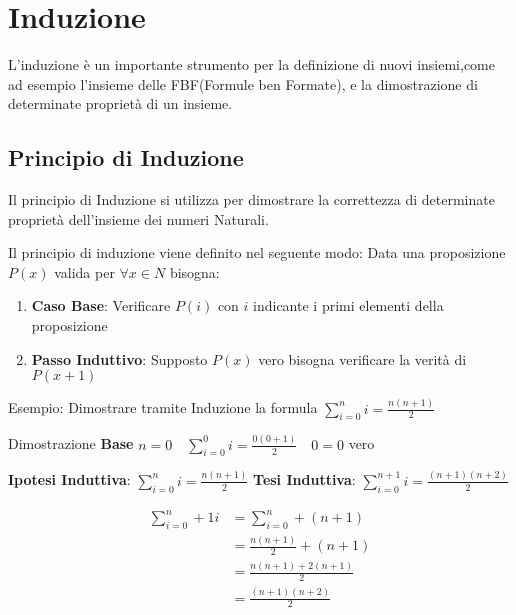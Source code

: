 \chapter{Induzione}
L'induzione è un importante strumento per la definizione di nuovi insiemi,come
ad esempio l'insieme delle FBF(Formule ben Formate), e la dimostrazione di determinate
proprietà di un insieme.

\section{Principio di Induzione}
Il principio di Induzione si utilizza per dimostrare la correttezza di determinate
proprietà dell'insieme dei numeri Naturali.

Il principio di induzione viene definito nel seguente modo:\newline
Data una proposizione $P(x)$ valida per $\forall x \in N$ bisogna:

\begin{enumerate}
  \item \textbf{Caso Base}: Verificare $P(i)$ con $i$ indicante i primi elementi della proposizione
  \item \textbf{Passo Induttivo}: Supposto $P(x)$ vero  bisogna verificare la verità di $P(x+1)$
\end{enumerate}

Esempio:\newline
Dimostrare tramite Induzione la formula $\displaystyle \sum_{i = 0} ^ n i = \frac{n(n + 1)}{2}$

Dimostrazione \newline
\textbf{Base} $n = 0 \quad \displaystyle \sum_{i = 0} ^ 0 i = \frac{0(0 + 1)}{2} \quad 0 = 0$ vero

\textbf{Ipotesi Induttiva}: $\displaystyle \sum_{i = 0} ^ n i = \frac{n(n+1)}{2}$ \newline
\textbf{Tesi Induttiva}: $\displaystyle \sum_{i = 0} ^ {n+1} i = \frac{(n+1)(n+2)}{2}$

\begin{equation*}
\begin{split}
  \sum_{i = 0}^n+1 i & = \sum_{i = 0} ^ n + (n+1) \\
                     & = \frac{n(n+1)}{2} + (n+1) \\
                     & = \frac{n(n+1) + 2(n+1)}{2} \\
                     & = \frac{(n+1)(n+2)}{2} \\
\end{split}
\end{equation*}

